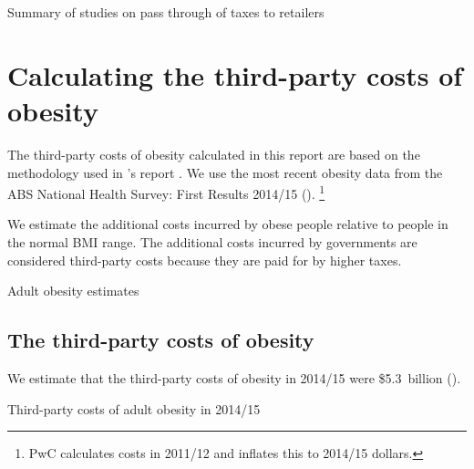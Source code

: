 \documentclass[embargoed]{grattan}
\begin{document}



\begin{table}[t]
\caption{Summary of studies on pass through of \SSB{} taxes to retailers}



\end{table}
\twocolumn

\chapter{Calculating the third-party costs of obesity }\label{appendix-2-estimating-the-third-party-costs-of-obesity}

The third-party costs of obesity calculated in this report are based on the methodology used in \citeauthor{PwC2015Weighingcostobesity}'s \citeyear{PwC2015Weighingcostobesity} report . We use the most recent obesity data from the ABS National Health Survey: First Results 2014/15 ().%
\footnote{PwC calculates costs in 2011/12 and inflates this to 2014/15 dollars.}

We estimate the additional costs incurred by obese people relative to people in the normal BMI range.
The additional costs incurred by governments are considered third-party costs because they are paid for by higher taxes.



\begin{table}
\caption{Adult obesity estimates}\label{tbl:Adult-obesity-estimates}



\end{table}

\section{The third-party costs of obesity}\label{the-third-party-costs-of-obesity}

We estimate that the third-party costs of obesity in 2014/15 were \$5.3~billion ().

\begin{table}
\caption{Third-party costs of adult obesity in 2014/15}\label{tbl:3rd-party-costs-of-adult-obesity}



\end{table}
\end{document}
